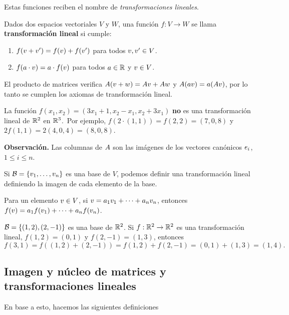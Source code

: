Estas funciones reciben el nombre de \emph{transformaciones lineales}.

\begin{defi}
Dados dos espacios vectoriales $V$ y $W$, una función $f: V \rightarrow W$ se llama \textbf{transformación lineal} si cumple:
\begin{enumerate}
\item  $f(\vb + \vb')= f(\vb) + f(\vb')$ para todos $\vb, \vb' \in V$.
\item  $f(a \cdot \vb) = a \cdot f(\vb)$ para todos $a \in \mathbb R$ y $\vb \in V$.
\end{enumerate}
\end{defi}

El producto de matrices verifica $\Ab(\vb+\wb) = \Ab\vb + \Ab\wb$ y $\Ab(a\vb) = a(\Ab\vb)$, por lo tanto se cumplen los axiomas de transformación lineal.

\begin{ejemplo}
La función $f(x_1, x_2) = (3x_1 + 1, x_2 - x_1, x_2 + 3x_1)$ \textbf{no} es una transformación lineal de $\mathbb R^2$ en $\mathbb R^3$.\
Por ejemplo, $f(2 \cdot (1,1)) = f(2,2) = (7, 0, 8)$ y $2f(1,1) = 2(4, 0, 4)= (8,0,8)$.
\end{ejemplo}

\textbf{Observación.} Las columnas de $\Ab$ son las imágenes de los vectores canónicos $\eb_i$, $1 \le i \le n$.

\begin{prop} Si $\B = \{\vb_1, \dots, \vb_n\}$ es una base de $V$, podemos definir una transformación lineal definiendo la imagen de cada elemento de la base.
\end{prop}

Para un elemento $\vb \in V$, si $\vb = a_1 \vb_1 + \dots + a_n \vb_n$, entonces $f(\vb) = a_1 f(\vb_1) + \dots + a_n f(\vb_n)$.

\begin{ejemplo} $\mathcal B = \{(1,2), (2, -1)\}$ es una base de $\mathbb R^2$. Si $f: \mathbb R^2 \rightarrow \mathbb R^2$ es una transformación lineal, $f(1,2) = (0, 1)$ y $f(2, -1) = (1,3)$, entonces
$$f(3, 1) = f((1,2) + (2, -1)) = f(1,2) + f(2, -1)= (0,1) + (1,3) = (1, 4).$$
\end{ejemplo}

\subsection{Imagen y núcleo de matrices y transformaciones lineales}

En base a esto, hacemos las siguientes definiciones

